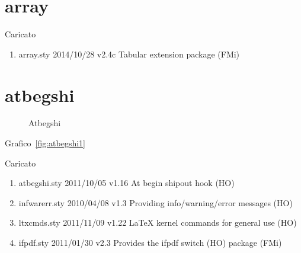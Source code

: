 \section{array}

Caricato 
\begin{enumerate}
\item array.sty 2014/10/28 v2.4c Tabular extension package (FMi)
\end{enumerate}
\section{atbegshi}
\begin{figure}
	\centering
	\caption{Atbegshi}
	\label{fig:atbegshi1}
\end{figure}

Grafico~\vref{fig:atbegshi1}

Caricato 
\begin{enumerate}
\item atbegshi.sty  2011/10/05 v1.16 At begin shipout hook (HO)
\item infwarerr.sty  2010/04/08 v1.3 Providing info/warning/error messages (HO)
\item ltxcmds.sty  2011/11/09 v1.22 LaTeX kernel commands for general use (HO)
\item ifpdf.sty  2011/01/30 v2.3 Provides the ifpdf switch (HO) package (FMi)
\end{enumerate}
